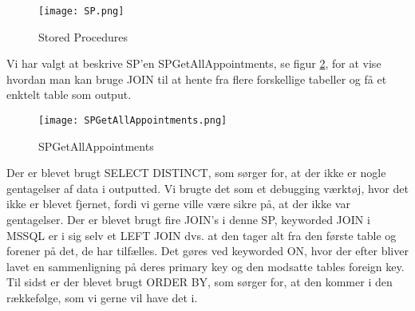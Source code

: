 \begin{figure}[h]
    \caption{Stored Procedures}
    \centering
        \texttt{[image: SP.png]}
    \label{StoredProcedures}
\end{figure}

Vi har valgt at beskrive SP'en SPGetAllAppointments, se figur \ref{SPGetAllAppointments}, for at vise hvordan man kan bruge JOIN til at hente fra flere forskellige tabeller og få et enktelt table som output.

\begin{figure}[h]
    \caption{SPGetAllAppointments}
    \centering
        \texttt{[image: SPGetAllAppointments.png]}
    \label{SPGetAllAppointments}
\end{figure}

Der er blevet brugt SELECT DISTINCT, som sørger for, at der ikke er nogle gentagelser af data i outputted.
Vi brugte det som et debugging værktøj, hvor det ikke er blevet fjernet, fordi vi gerne ville være sikre på, at der ikke var gentagelser.
Der er blevet brugt fire JOIN's i denne SP, keyworded JOIN i MSSQL er i sig selv et LEFT JOIN dvs. at den tager alt fra den første table og forener på det, de har tilfælles. Det gøres ved keyworded ON, hvor der efter bliver lavet en sammenligning på deres primary key og den modsatte tables foreign key.
Til sidst er der blevet brugt ORDER BY, som sørger for, at den kommer i den rækkefølge, som vi gerne vil have det i.
